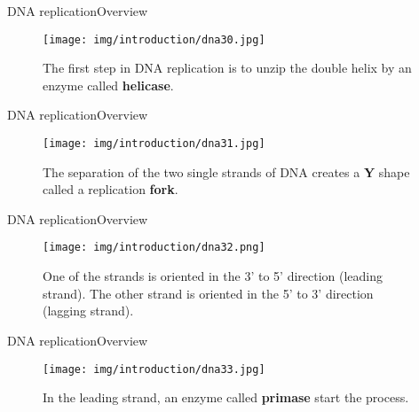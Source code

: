 \documentclass[10pt]{beamer}
\newcommand{\1}{
	\setbeamertemplate{background}{
		\texttt{[image: img/1]}
		\tikz[overlay] \fill[fill opacity=0.75,fill=white] (0,0) rectangle (-\paperwidth,\paperheight);
	}
}
\begin{document}
\begin{frame}{DNA replication}{Overview}
	\begin{figure}[]
		\centering
		\texttt{[image: img/introduction/dna30.jpg]}
		\label{img:mot2}
		\caption{The first step in DNA replication is to unzip the double helix by an enzyme called \textbf{helicase}.}
	\end{figure}
\end{frame}

\begin{frame}{DNA replication}{Overview}
	\begin{figure}[]
		\centering
		\texttt{[image: img/introduction/dna31.jpg]}
		\label{img:mot2}
		\caption{The separation of the two single strands of DNA creates a \textbf{Y} shape called a replication \textbf{fork}.}
	\end{figure}
\end{frame}

\begin{frame}{DNA replication}{Overview}
	\begin{figure}[]
		\centering
		\texttt{[image: img/introduction/dna32.png]}
		\label{img:mot2}
		\caption{One of the strands is oriented in the 3’ to 5’ direction (leading strand). The other strand is oriented in the 5’ to 3’ direction (lagging strand).}
	\end{figure}
\end{frame}

\begin{frame}{DNA replication}{Overview}
	\begin{figure}[]
		\centering
		\texttt{[image: img/introduction/dna33.jpg]}
		\label{img:mot2}
		\caption{In the leading strand, an enzyme called \textbf{primase} start the process.}
	\end{figure}
\end{frame}
\end{document}

